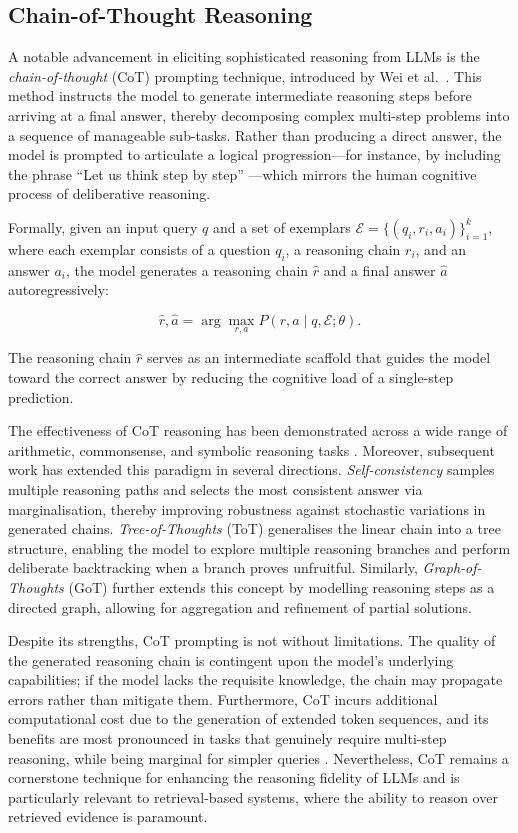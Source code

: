 \subsection{Chain-of-Thought Reasoning}

A notable advancement in eliciting sophisticated reasoning from LLMs is the \emph{chain-of-thought} (CoT) prompting technique, introduced by Wei et al.\ \cite{wei2022chain}. This method instructs the model to generate intermediate reasoning steps before arriving at a final answer, thereby decomposing complex multi-step problems into a sequence of manageable sub-tasks. Rather than producing a direct answer, the model is prompted to articulate a logical progression---for instance, by including the phrase ``Let us think step by step'' \cite{kojima2022large}---which mirrors the human cognitive process of deliberative reasoning.

Formally, given an input query \(q\) and a set of exemplars \(\mathcal{E} = \{(q_i, r_i, a_i)\}_{i=1}^{k}\), where each exemplar consists of a question \(q_i\), a reasoning chain \(r_i\), and an answer \(a_i\), the model generates a reasoning chain \(\hat{r}\) and a final answer \(\hat{a}\) autoregressively:

\[
\hat{r}, \hat{a} = \arg\max_{r,a} P(r, a \mid q, \mathcal{E}; \theta).
\]

The reasoning chain \(\hat{r}\) serves as an intermediate scaffold that guides the model toward the correct answer by reducing the cognitive load of a single-step prediction.

The effectiveness of CoT reasoning has been demonstrated across a wide range of arithmetic, commonsense, and symbolic reasoning tasks \cite{wei2022chain, wang2023selfconsistency}. Moreover, subsequent work has extended this paradigm in several directions. \emph{Self-consistency} \cite{wang2023selfconsistency} samples multiple reasoning paths and selects the most consistent answer via marginalisation, thereby improving robustness against stochastic variations in generated chains. \emph{Tree-of-Thoughts} (ToT) \cite{yao2023tree} generalises the linear chain into a tree structure, enabling the model to explore multiple reasoning branches and perform deliberate backtracking when a branch proves unfruitful. Similarly, \emph{Graph-of-Thoughts} (GoT) \cite{besta2024graph} further extends this concept by modelling reasoning steps as a directed graph, allowing for aggregation and refinement of partial solutions.

Despite its strengths, CoT prompting is not without limitations. The quality of the generated reasoning chain is contingent upon the model's underlying capabilities; if the model lacks the requisite knowledge, the chain may propagate errors rather than mitigate them. Furthermore, CoT incurs additional computational cost due to the generation of extended token sequences, and its benefits are most pronounced in tasks that genuinely require multi-step reasoning, while being marginal for simpler queries \cite{wei2022chain}. Nevertheless, CoT remains a cornerstone technique for enhancing the reasoning fidelity of LLMs and is particularly relevant to retrieval-based systems, where the ability to reason over retrieved evidence is paramount.
